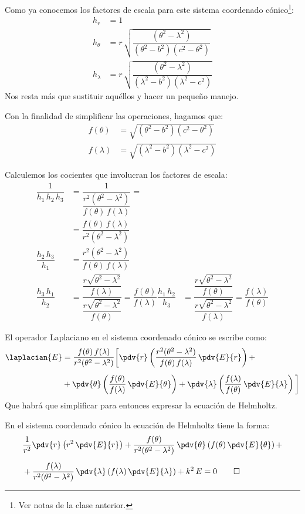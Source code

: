 Como ya conocemos los factores de escala para este sistema coordenado cónico\footnote{Ver notas de la clase anterior.}:
\begin{align*}
h_{r} &= 1 \\[0.5em]
h_{\theta} &=  r \, \sqrt{\dfrac{(\theta^{2} - \lambda^{2})}{(\theta^{2} - b^{2})(c^{2} - \theta^{2})}} \\[0.5em]
h_{\lambda} &= r \, \sqrt{\dfrac{(\theta^{2} - \lambda^{2})}{(\lambda^{2} - b^{2})(\lambda^{2} - c^{2})}}
\end{align*}
Nos resta más que sustituir aquéllos y hacer un pequeño manejo.
\par
Con la finalidad de simplificar las operaciones, hagamos que:
\begin{align*}
f(\theta) &= \sqrt{(\theta^{2} - b^{2})(c^{2} - \theta^{2})} \\[0.5em] 
f(\lambda) &= \sqrt{(\lambda^{2} - b^{2})(\lambda^{2} - c^{2})}
\end{align*}

Calculemos los cocientes que involucran los factores de escala:
\begin{align*}
\dfrac{1}{h_{1} \, h_{2} \, h_{3}} &= \dfrac{1}{\dfrac{r^{2} (\theta^{2} - \lambda^{2})}{f(\theta) \, f(\lambda)}} = \\[0.5em] 
&= \dfrac{f(\theta) \, f(\lambda)}{r^{2} (\theta^{2} - \lambda^{2})} \\[0.5em]
\dfrac{h_{2} \, h_{3}}{h_{1}} &= \dfrac{r^{2} (\theta^{2} - \lambda^{2})}{f(\theta) \, f(\lambda)} \\[0.5em]
\dfrac{h_{3} \, h_{1}}{h_{2}} &=  \dfrac{\dfrac{r \sqrt{\theta^{2} - \lambda^{2}}}{f(\lambda)}}{\dfrac{r \sqrt{\theta^{2} - \lambda^{2}}}{f(\theta)}} =  \dfrac{f (\theta)}{f (\lambda)}
\dfrac{h_{1} \, h_{2}}{h_{3}} &=  \dfrac{\dfrac{r \sqrt{\theta^{2} - \lambda^{2}}}{f(\theta)}}{\dfrac{r \sqrt{\theta^{2} - \lambda^{2}}}{f(\lambda)}} =  \dfrac{f (\lambda)}{f (\theta)}
\end{align*}

El operador Laplaciano en el sistema coordenado cónico se escribe como:
\begin{align*}
\laplacian{E} &= \dfrac{f(\theta) \, f(\lambda)}{r^{2} (\theta^{2} - \lambda^{2})} \bigg[ \pdv{r} \left( \dfrac{r^{2} (\theta^{2} - \lambda^{2})}{f(\theta) \, f(\lambda)} \, \pdv{E}{r} \right) + \\[0.5em]
&+ \pdv{\theta} \left( \dfrac{f(\theta)}{f(\lambda)} \, \pdv{E}{\theta} \right) + \pdv{\lambda} \left( \dfrac{f(\lambda)}{f(\theta)} \, \pdv{E}{\lambda} \right) \bigg]
\end{align*}
Que habrá que simplificar para entonces expresar la ecuación de Helmholtz.
\par
En el sistema coordenado cónico la ecuación de Helmholtz tiene la forma:
\begin{align*}
&\dfrac{1}{r^{2}} \pdv{r} \left( r^{2} \, \pdv{E}{r} \right) + \dfrac{f(\theta)}{r^{2} (\theta^{2} - \lambda^{2})} \, \pdv{\theta} \left( f(\theta) \, \pdv{E}{\theta} \right) + \\[0.5em]
&+ \dfrac{f(\lambda)}{r^{2} (\theta^{2} - \lambda^{2})} \, \pdv{\lambda} \left( f(\lambda) \, \pdv{E}{\lambda} \right) + k^{2} \, E = 0 \qed
\end{align*}
